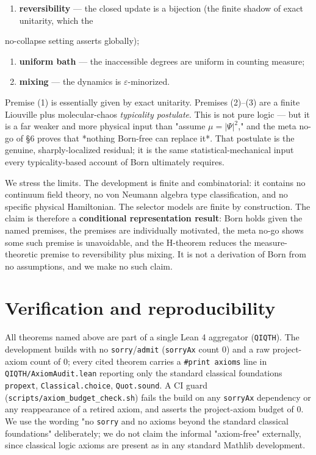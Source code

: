 \documentclass[11pt,a4paper]{article}
\begin{document}
\begin{enumerate}
  \item \textbf{reversibility} — the closed update is a bijection (the finite shadow of exact unitarity, which the
\end{enumerate}
   no-collapse setting asserts globally);
\begin{enumerate}
  \item \textbf{uniform bath} — the inaccessible degrees are uniform in counting measure;
  \item \textbf{mixing} — the dynamics is $\varepsilon$-minorized.
\end{enumerate}

Premise (1) is essentially given by exact unitarity. Premises (2)–(3) are a finite Liouville plus
molecular-chaos \emph{typicality postulate}. This is not pure logic — but it is a far weaker and more physical
input than "assume $\mu=\lvert\Psi\rvert^2$," and the meta no-go of §6 proves that *nothing Born-free can
replace it*. That postulate is the genuine, sharply-localized residual; it is the same statistical-mechanical
input every typicality-based account of Born ultimately requires.

We stress the limits. The development is finite and combinatorial: it contains no continuum field theory, no
von Neumann algebra type classification, and no specific physical Hamiltonian. The selector models are
finite by construction. The claim is therefore a \textbf{conditional representation result}: Born holds given the
named premises, the premises are individually motivated, the meta no-go shows some such premise is
unavoidable, and the H-theorem reduces the measure-theoretic premise to reversibility plus mixing. It is not
a derivation of Born from no assumptions, and we make no such claim.

\section{Verification and reproducibility}

All theorems named above are part of a single Lean 4 aggregator (\texttt{QIQTH}). The development builds with no
\texttt{sorry}/\texttt{admit} (\texttt{sorryAx} count $0$) and a raw project-axiom count of $0$; every cited theorem carries a
\texttt{\#print axioms} line in \texttt{QIQTH/AxiomAudit.lean} reporting only the standard classical foundations
\texttt{propext}, \texttt{Classical.choice}, \texttt{Quot.sound}. A CI guard (\texttt{scripts/axiom\_budget\_check.sh}) fails the build on
any \texttt{sorryAx} dependency or any reappearance of a retired axiom, and asserts the project-axiom budget of $0$.
We use the wording "no \texttt{sorry} and no axioms beyond the standard classical foundations" deliberately; we do
not claim the informal "axiom-free" externally, since classical logic axioms are present as in any standard
Mathlib development.
\end{document}

